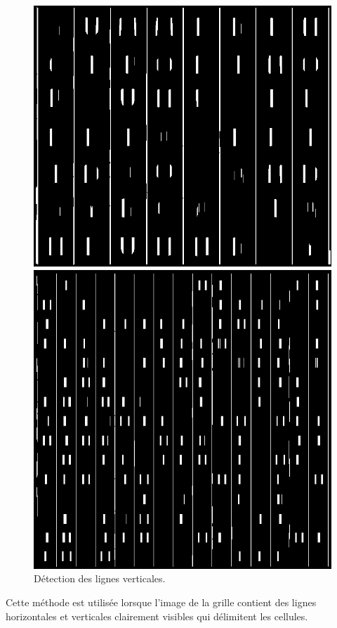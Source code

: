\documentclass{article}
\begin{document}
\begin{figure}[H]
  \centering
      \includegraphics[width=\linewidth]{ressources/image_1_step_09_vertical_lines.png}
      \caption{}
    \endminipage\quad\quad\quad\quad
    \includegraphics[width=\linewidth]{ressources/image_2_step_09_vertical_lines.png}
    \caption{}
  \endminipage
  \caption{Détection des lignes verticales.}
\end{figure}
Cette méthode est utilisée lorsque l'image de la grille contient des lignes horizontales et verticales clairement visibles qui délimitent les cellules.
\newpage
\end{document}
